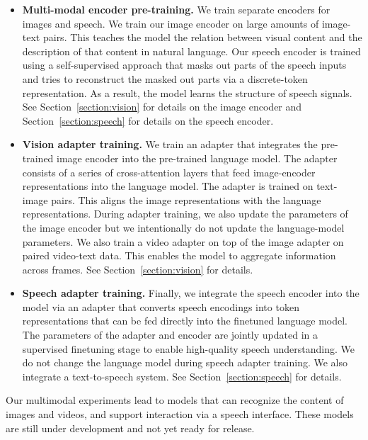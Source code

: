 \begin{itemize}

\item \textbf{Multi-modal encoder pre-training.} We train separate encoders for images and speech. We train our image encoder on large amounts of image-text pairs. This teaches the model the relation between visual content and the description of that content in natural language. Our speech encoder is trained using a self-supervised approach that masks out parts of the speech inputs and tries to reconstruct the masked out parts via a discrete-token representation. As a result, the model learns the structure of speech signals. See Section~\ref{section:vision} for details on the image encoder and Section~\ref{section:speech} for details on the speech encoder.

\item \textbf{Vision adapter training.} We train an adapter that integrates the pre-trained image encoder into the pre-trained language model. The adapter consists of a series of cross-attention layers that feed image-encoder representations into the language model. The adapter is trained on text-image pairs. This aligns the image representations with the language representations. During adapter training, we also update the parameters of the image encoder but we intentionally do not update the language-model parameters. We also train a video adapter on top of the image adapter on paired video-text data. This enables the model to aggregate information across frames. See Section~\ref{section:vision} for details.

\item \textbf{Speech adapter training.} Finally, we integrate the speech encoder into the model via an adapter that converts speech encodings into token representations that can be fed directly into the finetuned language model. The parameters of the adapter and encoder are jointly updated in a supervised finetuning stage to enable high-quality speech understanding. We do not change the language model during speech adapter training. We also integrate a text-to-speech system. See Section~\ref{section:speech} for details.

\end{itemize}

Our multimodal experiments lead to models that can recognize the content of images and videos, and support interaction via a speech interface. These models are still under development and not yet ready for release.

